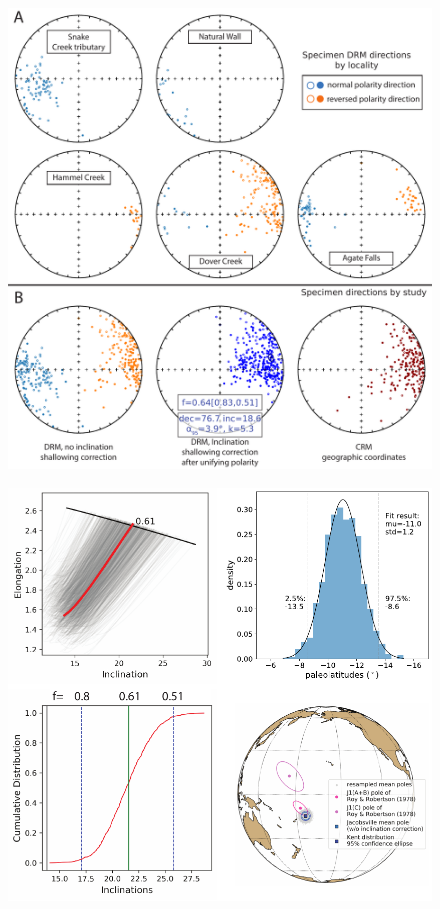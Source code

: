 \documentclass[draft]{agujournal2019}
\begin{document}
\begin{figure}[h!]
\centering
\includegraphics[width=\textwidth]{in_situ_pmag.pdf}
\caption{}
\label{fig:in_situ_pmag}
\end{figure}

\begin{figure}[h!]
\centering
\includegraphics[width=\textwidth]{EI_results.pdf}
\caption{}
\label{fig:EI_results}
\end{figure}
\end{document}
